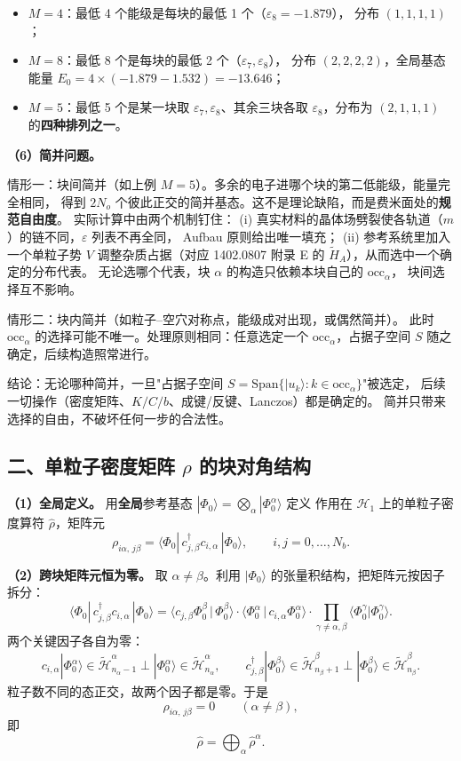 \documentclass[11pt]{ctexart}
\begin{document}
\begin{itemize}
\item $M=4$：最低 4 个能级是每块的最低 1 个（$\varepsilon_8=-1.879$），
分布 $(1,1,1,1)$；
\item $M=8$：最低 8 个是每块的最低 2 个（$\varepsilon_7,\varepsilon_8$），
分布 $(2,2,2,2)$，全局基态能量
$E_0=4\times(-1.879-1.532)=-13.646$；
\item $M=5$：最低 5 个是某一块取 $\varepsilon_7,\varepsilon_8$、其余三块各取
$\varepsilon_8$，分布为 $(2,1,1,1)$ 的\textbf{四种排列之一}。
\end{itemize}

\textbf{（6）简并问题。}

情形一：块间简并（如上例 $M=5$）。多余的电子进哪个块的第二低能级，能量完全相同，
得到 $2N_o$ 个彼此正交的简并基态。这不是理论缺陷，而是费米面处的\textbf{规范自由度}。
实际计算中由两个机制钉住：
(i) 真实材料的晶体场劈裂使各轨道（$m$）的链不同，$\varepsilon$ 列表不再全同，
Aufbau 原则给出唯一填充；
(ii) 参考系统里加入一个单粒子势 $V$ 调整杂质占据（对应 1402.0807 附录 E 的
$\tilde H_A$），从而选中一个确定的分布代表。
无论选哪个代表，块 $\alpha$ 的构造只依赖本块自己的 $\mathrm{occ}_\alpha$，
块间选择互不影响。

情形二：块内简并（如粒子--空穴对称点，能级成对出现，或偶然简并）。
此时 $\mathrm{occ}_\alpha$ 的选择可能不唯一。处理原则相同：任意选定一个
$\mathrm{occ}_\alpha$，占据子空间 $S$ 随之确定，后续构造照常进行。

结论：无论哪种简并，一旦"占据子空间
$S=\mathrm{Span}\{|u_k\rangle:k\in\mathrm{occ}_\alpha\}$"被选定，
后续一切操作（密度矩阵、$K/C/b$、成键/反键、Lanczos）都是确定的。
简并只带来选择的自由，不破坏任何一步的合法性。

\subsection{二、单粒子密度矩阵 $\rho$ 的块对角结构}

\textbf{（1）全局定义。}
用\textbf{全局}参考基态 $|\Phi_0\rangle=\bigotimes_\alpha|\Phi_0^\alpha\rangle$ 定义
作用在 $\mathcal{H}_1$ 上的单粒子密度算符 $\hat\rho$，矩阵元
\[
\rho_{i\alpha,\,j\beta}
=
\langle\Phi_0|\,c_{j,\beta}^{\dagger}c_{i,\alpha}\,|\Phi_0\rangle ,
\qquad i,j=0,\dots,N_b .
\]

\textbf{（2）跨块矩阵元恒为零。}
取 $\alpha\neq\beta$。利用 $|\Phi_0\rangle$ 的张量积结构，把矩阵元按因子拆分：
\[
\langle\Phi_0|\,c_{j,\beta}^{\dagger}c_{i,\alpha}\,|\Phi_0\rangle
=
\Big\langle c_{j,\beta}\Phi_0^{\beta}\,\Big|\,\Phi_0^{\beta}\Big\rangle
\cdot
\Big\langle \Phi_0^{\alpha}\,\Big|\,c_{i,\alpha}\Phi_0^{\alpha}\Big\rangle
\cdot
\prod_{\gamma\neq\alpha,\beta}\big\langle\Phi_0^{\gamma}\big|\Phi_0^{\gamma}\big\rangle .
\]
两个关键因子各自为零：
\[
c_{i,\alpha}|\Phi_0^{\alpha}\rangle\in\tilde{\mathcal{H}}_{n_\alpha-1}^\alpha
\perp|\Phi_0^{\alpha}\rangle\in\tilde{\mathcal{H}}_{n_\alpha}^\alpha ,
\qquad
c_{j,\beta}^{\dagger}|\Phi_0^{\beta}\rangle\in\tilde{\mathcal{H}}_{n_\beta+1}^\beta
\perp|\Phi_0^{\beta}\rangle\in\tilde{\mathcal{H}}_{n_\beta}^\beta .
\]
粒子数不同的态正交，故两个因子都是零。于是
\[
\rho_{i\alpha,\,j\beta}=0\qquad(\alpha\neq\beta),
\]
即
\[
\hat\rho=\bigoplus_\alpha\hat\rho^\alpha .
\]
\end{document}
